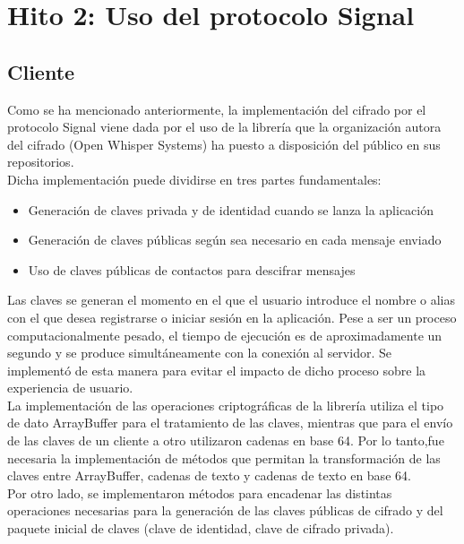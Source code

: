\section{Hito 2: Uso del protocolo Signal}

\subsection{Cliente}

Como se ha mencionado anteriormente, la implementación del cifrado por el protocolo Signal viene dada por el uso de la librería que la organización autora del cifrado (Open Whisper Systems) ha puesto a disposición del público en sus repositorios. \\ 

Dicha implementación puede dividirse en tres partes fundamentales: 

\begin{itemize}
\item {Generación de claves privada y de identidad cuando se lanza la aplicación}
\item {Generación de claves públicas según sea necesario en cada mensaje enviado}
\item {Uso de claves públicas de contactos para descifrar mensajes}
\end{itemize}

Las claves se generan el momento en el que el usuario introduce el nombre o alias con el que desea registrarse o iniciar sesión en la aplicación. Pese a ser un proceso computacionalmente pesado, el tiempo de ejecución es de aproximadamente un segundo y se produce simultáneamente con la conexión al servidor. Se implementó de esta manera para evitar el impacto de dicho proceso sobre la experiencia de usuario. \\

La implementación de las operaciones criptográficas de la librería utiliza el tipo de dato ArrayBuffer para el tratamiento de las claves, mientras que para el envío de las claves de un cliente a otro utilizaron cadenas en base 64. Por lo tanto,fue necesaria la implementación de métodos que permitan la transformación de las claves entre ArrayBuffer, cadenas de texto y cadenas de texto en base 64. \\

Por otro lado, se implementaron métodos para encadenar las distintas operaciones necesarias para la generación de las claves públicas de cifrado y del paquete inicial de claves (clave de identidad, clave de cifrado privada). \\

